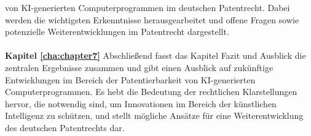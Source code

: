 von KI-generierten Computerprogrammen im deutschen Patentrecht. 
Dabei werden die wichtigsten Erkenntnisse herausgearbeitet 
und offene Fragen sowie potenzielle Weiterentwicklungen im Patentrecht dargestellt.
\\
\\
\textbf{Kapitel \ref{cha:chapter7}} 
Abschließend fasst das Kapitel Fazit und Ausblick die zentralen Ergebnisse zusammen 
und gibt einen Ausblick auf zukünftige Entwicklungen im Bereich der Patentierbarkeit 
von KI-generierten Computerprogrammen. 
Es hebt die Bedeutung der rechtlichen Klarstellungen hervor, 
die notwendig sind, um Innovationen im Bereich der künstlichen Intelligenz zu schützen, 
und stellt mögliche Ansätze für eine Weiterentwicklung des deutschen Patentrechts dar.